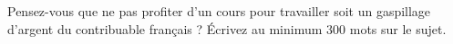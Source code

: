 
\begin{exercice}\label{exosmath-0442}

    Pensez-vous que ne pas profiter d'un cours pour travailler soit un gaspillage d'argent du contribuable français ? Écrivez au minimum \( 300\) mots sur le sujet.

\end{exercice}

